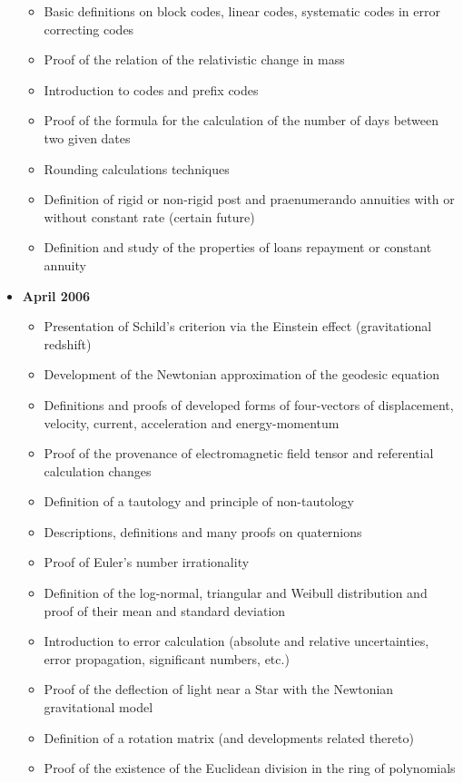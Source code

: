 \documentclass[12pt,a4paper,twoside,openright]{report}
\newcounter{def}
\theoremstyle{definition}
\theoremstyle{itexmp}
\numberwithin{equation}{section}
\begin{document}
\begin{itemize}
\begin{itemize}[noitemsep]
				\item Basic definitions on block codes, linear codes, systematic codes in error correcting codes
				\item Proof of the relation of the relativistic change in mass
				\item Introduction to codes and prefix codes
				\item Proof of the formula for the calculation of the number of days between two given dates 
				\item Rounding calculations techniques
				\item Definition of rigid or non-rigid post and praenumerando annuities with or without constant rate (certain future)
				\item Definition and study of the properties of loans repayment or constant annuity
			\end{itemize}
		\item \textbf{April 2006}
			\begin{itemize}[noitemsep]
				\item Presentation of Schild's criterion via the Einstein effect (gravitational redshift)
				\item Development of the Newtonian approximation of the geodesic equation
				\item Definitions and proofs of developed forms of four-vectors of displacement, velocity, current, acceleration and energy-momentum
				\item Proof of the provenance of electromagnetic field tensor and referential calculation changes
				\item Definition of a tautology and principle of non-tautology
				\item Descriptions, definitions and many proofs on quaternions
				\item Proof of Euler's number irrationality
				\item Definition of the log-normal, triangular and Weibull distribution and proof of their mean and standard deviation
				\item Introduction to error calculation (absolute and relative uncertainties, error propagation, significant numbers, etc.)
				\item Proof of the deflection of light near a Star with the Newtonian gravitational model
				\item Definition of a rotation matrix (and developments related thereto)
				\item Proof of the existence of the Euclidean division in the ring of polynomials

\end{itemize}
\end{itemize}
\end{document}

